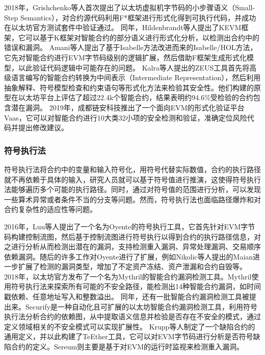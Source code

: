     2018年，Grishchenko等人首次提出了以太坊虚拟机字节码的小步骤语义\cite{grishchenko2018semantic}（Small-Step Semantics），对合约源代码利用F*框架进行形式化得到可执行代码，并成功在以太坊官方测试套件中验证通过。
    同年，Hildenbrandt等人提出了KEVM框架\cite{hildenbrandt2018kevm}，它可以基于K框架对智能合约的部分语义进行形式化分析，以检测出合约中的错误和漏洞。
    Amani等人提出了基于Isabelle方法改进而来的Isabelle/HOL方法\cite{amani2018}，它先对智能合约进行EVM字节码级别的逻辑扩展，然后借助F框架生成形式化模型，以此验证代码逻辑中可能存在的问题。
    Kalra等人提出的ZEUS工具\cite{kalra2018zeus}首先将高级语言编写的智能合约转换为中间表示（Intermediate Representation），然后利用抽象解释、符号模型检查和约束语句等形式化方法来检验其安全性。他们构建的原型在以太坊平台上评估了超过22.4k个智能合约，结果表明约94.6\%受检验的合约包含潜在漏洞。
    2019年，成都链安科技推出了一个面向EVM的形式化验证平台Vaas\cite{lianan}，它可以对智能合约进行10大类32小项的安全检测和验证，准确定位风险代码并提出修改建议。

    \subsubsection{符号执行法}
    
    符号执行法将合约中的变量和输入符号化，用符号代替实际数值，合约的执行路径就不再依赖于具体的输入，研究人员就可以基于符号值进行推演，这使得符号执行法能够遍历多个可能的执行路径。同时，通过对符号值的范围进行分析，可以发现一些算术异常或者条件不当的分支等问题。然而，符号执行法也面临路径爆炸和对合约复杂性的适应性等问题。
    
    2016年，Luu等人提出了一个名为Oyente\cite{luu2016making}的符号执行工具，它首先针对EVM字节码构建控制流图，然后基于控制流图进行符号执行以得到合约的执行路径信息，对之进行分析从而检测出潜在的漏洞，支持检测重入漏洞、异常处理漏洞、交易顺序依赖漏洞。随后的许多工作对Oyente进行了扩展，例如Nikolic等人提出的Maian\cite{maian}进一步扩展了检测的漏洞类型，增加了不定资产冻结、资产泄漏和合约自毁等。
    2018年，以太坊官方发布了一个名为Mythril\cite{mythril}的智能合约漏洞检测工具。Mythril使用符号执行法来探索所有可能的不安全路径，能检测出14种智能合约漏洞，如时间戳依赖、任意地址写入和整数溢出。
    同年，还有一批智能合约漏洞检测工具被提出来。Securify\cite{tsankov2018securify}是一种自动化且可扩展的以太坊智能合约漏洞检测工具，利用符号执行法分析合约的依赖图，从中提取语义信息并检验是否存在不安全的模式，通过定义领域相关的不安全模式可以实现扩展性。
    Krupp等人制定了一个缺陷合约的通用定义，并以此构建了TeEther\cite{krupp2018teether}工具，它可以对EVM字节码进行分析是否符号缺陷合约的定义。Sereum\cite{rodler2018sereum}则主要是基于对EVM的运行时监视来检测重入漏洞。
